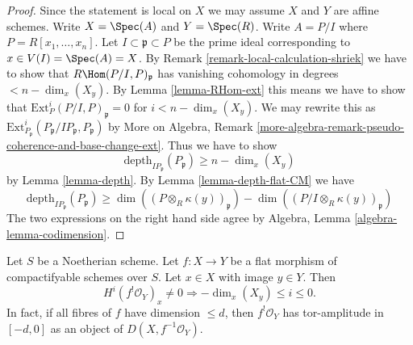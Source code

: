 \begin{proof}
Since the statement is local on $X$ we may assume $X$
and $Y$ are affine schemes. Write
$X = \Spec(A)$ and $Y = \Spec(R)$.
Write $A = P/I$ where $P = R[x_1, \ldots, x_n]$.
Let $I \subset \mathfrak p \subset P$ be the prime ideal
corresponding to $x \in V(I) = \Spec(A) = X$.
By Remark \ref{remark-local-calculation-shriek}
we have to show that $R\Hom(P/I, P)_\mathfrak p$
has vanishing cohomology in degrees $< n - \dim_x(X_y)$.
By Lemma \ref{lemma-RHom-ext} this means we have to
show that $\text{Ext}_P^i(P/I, P)_\mathfrak p = 0$
for $i < n - \dim_x(X_y)$. We may rewrite this as
$\text{Ext}_{P_\mathfrak p}^i(P_\mathfrak p/IP_\mathfrak p, P_\mathfrak p)$
by More on Algebra, Remark
\ref{more-algebra-remark-pseudo-coherence-and-base-change-ext}.
Thus we have to show
$$
\text{depth}_{IP_\mathfrak p}(P_\mathfrak p) \geq n - \dim_x(X_y)
$$
by Lemma \ref{lemma-depth}. By
Lemma \ref{lemma-depth-flat-CM}
we have
$$
\text{depth}_{IP_\mathfrak p}(P_\mathfrak p) \geq
\dim((P \otimes_R \kappa(y))_\mathfrak p) -
\dim((P/I \otimes_R \kappa(y))_\mathfrak p)
$$
The two expressions on the right hand side agree by
Algebra, Lemma \ref{algebra-lemma-codimension}.
\end{proof}

\begin{lemma}
\label{lemma-flat-shriek}
Let $S$ be a Noetherian scheme. Let $f : X \to Y$ be a flat morphism of
compactifyable schemes over $S$. Let $x \in X$ with image $y \in Y$.
Then
$$
H^i(f^!\mathcal{O}_Y)_x \not = 0
\Rightarrow - \dim_x(X_y) \leq i \leq 0.
$$
In fact, if all fibres of $f$ have dimension $\leq d$, then
$f^!\mathcal{O}_Y$ has tor-amplitude in $[-d, 0]$ as an object
of $D(X, f^{-1}\mathcal{O}_Y)$.
\end{lemma}


